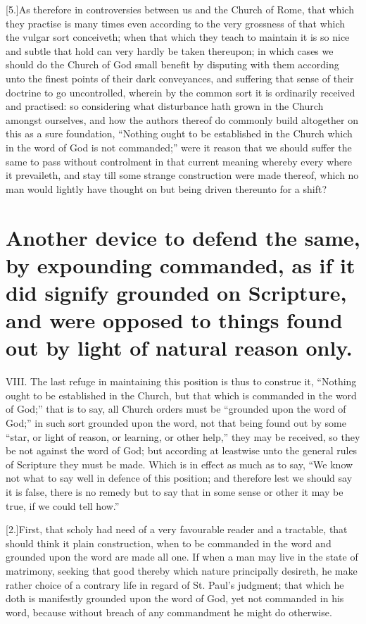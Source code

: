 [5.]As therefore in controversies between us and the Church of Rome, that which they practise is many times even according to the very grossness of that which the vulgar sort conceiveth; when that which they teach to maintain it is so nice and subtle that hold can very hardly be taken thereupon; in which cases we should do the Church of God small benefit by disputing with them according unto the finest points of their dark conveyances, and suffering that sense of their doctrine to go uncontrolled, wherein by the common sort it is ordinarily received and practised: so considering what disturbance hath grown in the Church amongst ourselves, and how the authors thereof do commonly build altogether on this as a sure foundation, “Nothing ought to be established in the Church which in the word of God is not commanded;” were it reason that we should suffer the same to pass without controlment in that current meaning whereby every where it prevaileth, and stay till some strange construction were made thereof, which no man would lightly have thought on but being driven thereunto for a shift?

\section*{Another device to defend the same, by expounding commanded, as if it did signify grounded on Scripture, and were opposed to things found out by light of natural reason only.}

VIII. The last refuge in maintaining this position is thus to construe it, “Nothing ought to be established in the Church, but that which is commanded in the word of God;” that is to say, all Church orders must be “grounded upon the word of God;” in such sort grounded upon the word, not that being found out by some “star, or light of reason, or learning, or other help,” they may be received, so they be not against the word of God; but according at leastwise unto the general rules of Scripture they must be made. Which is in effect as much as to say, “We know not what to say well in defence of this position; and therefore lest we should say it is false, there is no remedy but to say that in some sense or other it may be true, if we could tell how.”

[2.]First, that scholy had need of a very favourable reader and a tractable, that should think it plain construction, when to be commanded in the word and grounded upon the word are made all one. If when a man may live in the state of matrimony, seeking that good thereby which nature principally  desireth, he make rather choice of a contrary life in regard of St. Paul’s judgment; that which he doth is manifestly grounded upon the word of God, yet not commanded in his word, because without breach of any commandment he might do otherwise.

